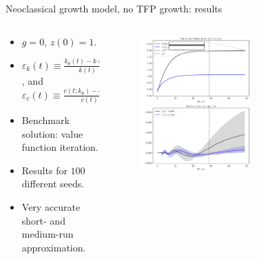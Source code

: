 \documentclass[aspectratio=169,10pt]{beamer}
\begin{document}
\begin{frame}{Neoclassical growth model, no TFP growth: results}
	\begin{columns}
		\begin{column}{0.5\textwidth}
			\begin{itemize}
				\item $g=0$, $z(0)=1$.
				\vspace{0.05in}
				\item $\varepsilon_k(t)\equiv \frac{k_\theta(t)-k(t)}{k(t)}$, and  $\varepsilon_c(t)\equiv \frac{c(t;k_\theta)-c(t)}{c(t)}$ 
				\vspace{0.05in}
				\item Benchmark solution: value function iteration.
				\vspace{0.05in}
				\item Results for $100$ different seeds.
				\vspace{0.05in}
				\item Very accurate short- and medium-run approximation.
			\end{itemize}
		\end{column}
		\begin{column}{0.65\textwidth}
			\begin{figure}[t!]
				\centering
				\includegraphics[width=0.6\textwidth]{figs/growth_sequential_g0.pdf}
				\hspace{25mm}
			\end{figure}
		\end{column}
	\end{columns}
\end{frame}
\end{document}
